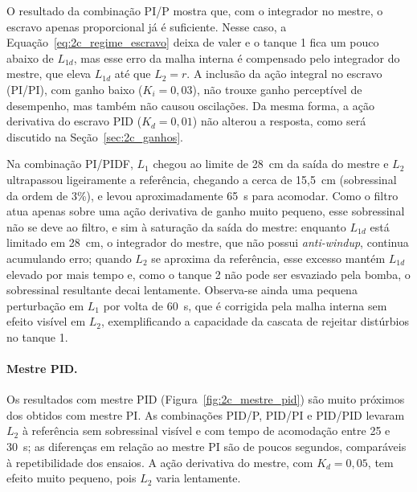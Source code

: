 \documentclass[a4paper,12pt]{article}
\begin{document}
\begin{justify}
    \hspace{4ex}O resultado da combinação PI/P mostra que, com o integrador no mestre, o escravo apenas proporcional já é suficiente. Nesse caso, a Equação~\eqref{eq:2c_regime_escravo} deixa de valer e o tanque 1 fica um pouco abaixo de $L_{1d}$, mas esse erro da malha interna é compensado pelo integrador do mestre, que eleva $L_{1d}$ até que $L_2 = r$. A inclusão da ação integral no escravo (PI/PI), com ganho baixo ($K_i = 0{,}03$), não trouxe ganho perceptível de desempenho, mas também não causou oscilações. Da mesma forma, a ação derivativa do escravo PID ($K_d = 0{,}01$) não alterou a resposta, como será discutido na Seção~\ref{sec:2c_ganhos}.
\end{justify}

\begin{justify}
    \hspace{4ex}Na combinação PI/PIDF, $L_1$ chegou ao limite de 28~cm da saída do mestre e $L_2$ ultrapassou ligeiramente a referência, chegando a cerca de 15,5~cm (sobressinal da ordem de 3\%), e levou aproximadamente 65~s para acomodar. Como o filtro atua apenas sobre uma ação derivativa de ganho muito pequeno, esse sobressinal não se deve ao filtro, e sim à saturação da saída do mestre: enquanto $L_{1d}$ está limitado em 28~cm, o integrador do mestre, que não possui \textit{anti-windup}, continua acumulando erro; quando $L_2$ se aproxima da referência, esse excesso mantém $L_{1d}$ elevado por mais tempo e, como o tanque 2 não pode ser esvaziado pela bomba, o sobressinal resultante decai lentamente. Observa-se ainda uma pequena perturbação em $L_1$ por volta de 60~s, que é corrigida pela malha interna sem efeito visível em $L_2$, exemplificando a capacidade da cascata de rejeitar distúrbios no tanque 1.
\end{justify}

\paragraph{Mestre PID.}

\begin{justify}
    \hspace{4ex}Os resultados com mestre PID (Figura~\ref{fig:2c_mestre_pid}) são muito próximos dos obtidos com mestre PI. As combinações PID/P, PID/PI e PID/PID levaram $L_2$ à referência sem sobressinal visível e com tempo de acomodação entre 25 e 30~s; as diferenças em relação ao mestre PI são de poucos segundos, comparáveis à repetibilidade dos ensaios. A ação derivativa do mestre, com $K_d = 0{,}05$, tem efeito muito pequeno, pois $L_2$ varia lentamente.
\end{justify}
\end{document}
